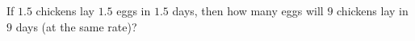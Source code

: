 If $1.5$ chickens lay $1.5$ eggs in $1.5$ days, then how many eggs will $9$ chickens lay in $9$ days (at the same rate)?
